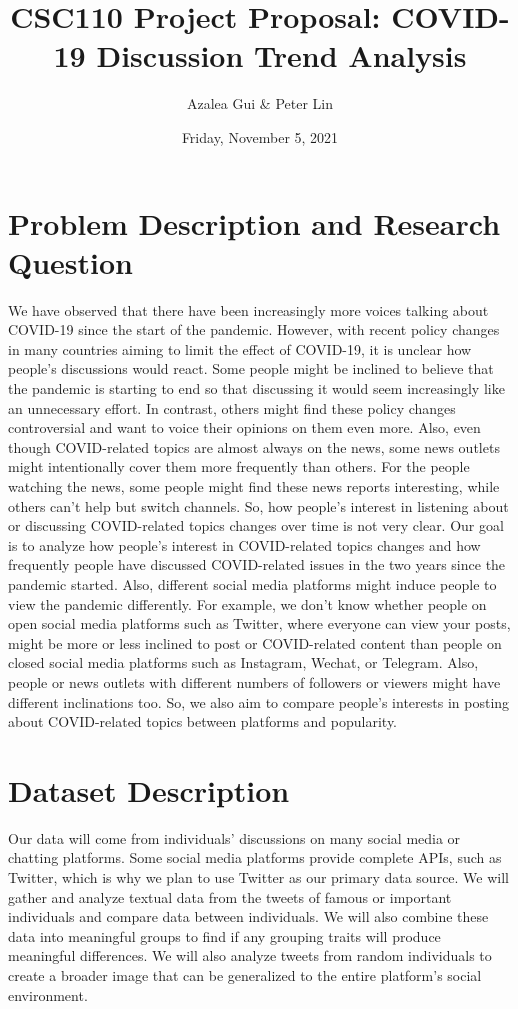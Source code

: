 \documentclass[fontsize=11pt]{article}
\title{CSC110 Project Proposal: COVID-19 Discussion Trend Analysis}
\author{Azalea Gui \& Peter Lin}
\date{Friday, November 5, 2021}
\begin{document}
    \maketitle

    \section*{Problem Description and Research Question}

    We have observed that there have been increasingly more voices talking about COVID-19 since the start of the pandemic. However, with recent policy changes in many countries aiming to limit the effect of COVID-19, it is unclear how people’s discussions would react. Some people might be inclined to believe that the pandemic is starting to end so that discussing it would seem increasingly like an unnecessary effort. In contrast, others might find these policy changes controversial and want to voice their opinions on them even more. Also, even though COVID-related topics are almost always on the news, some news outlets might intentionally cover them more frequently than others. For the people watching the news, some people might find these news reports interesting, while others can’t help but switch channels. So, how people’s interest in listening about or discussing COVID-related topics changes over time is not very clear. Our goal is to analyze how people’s interest in COVID-related topics changes and how frequently people have discussed COVID-related issues in the two years since the pandemic started. Also, different social media platforms might induce people to view the pandemic differently. For example, we don’t know whether people on open social media platforms such as Twitter, where everyone can view your posts, might be more or less inclined to post or COVID-related content than people on closed social media platforms such as Instagram, Wechat, or Telegram. Also, people or news outlets with different numbers of followers or viewers might have different inclinations too. So, we also aim to compare people’s interests in posting about COVID-related topics between platforms and popularity.

    \section*{Dataset Description}

    Our data will come from individuals’ discussions on many social media or chatting platforms. Some social media platforms provide complete APIs, such as Twitter, which is why we plan to use Twitter as our primary data source. We will gather and analyze textual data from the tweets of famous or important individuals and compare data between individuals. We will also combine these data into meaningful groups to find if any grouping traits will produce meaningful differences. We will also analyze tweets from random individuals to create a broader image that can be generalized to the entire platform’s social environment.
\end{document}
